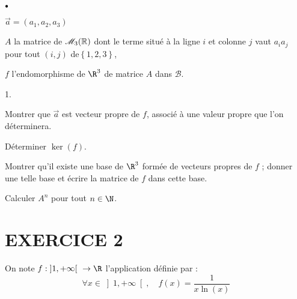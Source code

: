 \documentclass[11pt]{article}%
\begin{document}
\begin{noliste}{$\scriptstyle \bullet$}
\item $\overrightarrow{a} = \left( a_{1},a_{2},a_{3}\right) $

\item $A$ la matrice de $\mathscr{M}_{3}(\mathbb{R}) $ dont le
terme situé à la ligne $i$ et colonne $j$ vaut $a_{i}a_{j}$ pour tout
$\left( i,j\right) $ de$\left\{ 1,2,3\right\} $,

\item $f$ l'endomorphisme de $\R^{3}$ de matrice $A$ dans
$\mathcal{B}$.
\end{noliste}

\begin{noliste}{1.}
 \setlength{\itemsep}{4mm}
\item Montrer que $\overrightarrow{a}$ est vecteur propre de $f$,
associé à
une valeur propre que l'on déterminera.

\item Déterminer $\ker \left( f\right) $.

\item Montrer qu'il existe une base de $\R^{3}$ formée de vecteurs
propres de $f$ ; donner une telle base et écrire la matrice de $f$ dans
cette base.

\item Calculer $A^{n}$ pour tout $n\in \N$.
\end{noliste}

\section*{EXERCICE 2}

On note $f :\left] 1, + \infty \right[ \ \rightarrow \R$ l'application
définie par : 
\[
\forall x\in \left] 1, + \infty \right[,\quad f\left( x\right) =
\dfrac{1}{x\ln \left( x\right) }
\]
\end{document}
